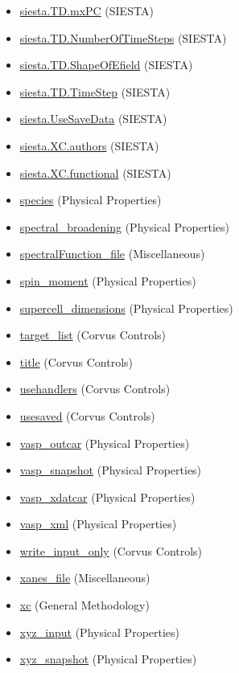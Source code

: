 \documentclass[11pt]{article}
\begin{document}
\begin{itemize}
\item \hyperref[kw:siesta-TD-mxPC]{siesta.TD.mxPC} (SIESTA)
\item \hyperref[kw:siesta-TD-NumberOfTimeSteps]{siesta.TD.NumberOfTimeSteps} (SIESTA)
\item \hyperref[kw:siesta-TD-ShapeOfEfield]{siesta.TD.ShapeOfEfield} (SIESTA)
\item \hyperref[kw:siesta-TD-TimeStep]{siesta.TD.TimeStep} (SIESTA)
\item \hyperref[kw:siesta-UseSaveData]{siesta.UseSaveData} (SIESTA)
\item \hyperref[kw:siesta-XC-authors]{siesta.XC.authors} (SIESTA)
\item \hyperref[kw:siesta-XC-functional]{siesta.XC.functional} (SIESTA)
\item \hyperref[kw:species]{species} (Physical Properties)
\item \hyperref[kw:spectral-broadening]{spectral\_broadening} (Physical Properties)
\item \hyperref[kw:spectralFunction-file]{spectralFunction\_file} (Miscellaneous)
\item \hyperref[kw:spin-moment]{spin\_moment} (Physical Properties)
\item \hyperref[kw:supercell-dimensions]{supercell\_dimensions} (Physical Properties)
\item \hyperref[kw:target-list]{target\_list} (Corvus Controls)
\item \hyperref[kw:title]{title} (Corvus Controls)
\item \hyperref[kw:usehandlers]{usehandlers} (Corvus Controls)
\item \hyperref[kw:usesaved]{usesaved} (Corvus Controls)
\item \hyperref[kw:vasp-outcar]{vasp\_outcar} (Physical Properties)
\item \hyperref[kw:vasp-snapshot]{vasp\_snapshot} (Physical Properties)
\item \hyperref[kw:vasp-xdatcar]{vasp\_xdatcar} (Physical Properties)
\item \hyperref[kw:vasp-xml]{vasp\_xml} (Physical Properties)
\item \hyperref[kw:write-input-only]{write\_input\_only} (Corvus Controls)
\item \hyperref[kw:xanes-file]{xanes\_file} (Miscellaneous)
\item \hyperref[kw:xc]{xc} (General Methodology)
\item \hyperref[kw:xyz-input]{xyz\_input} (Physical Properties)
\item \hyperref[kw:xyz-snapshot]{xyz\_snapshot} (Physical Properties)
\end{itemize}
\end{document}
